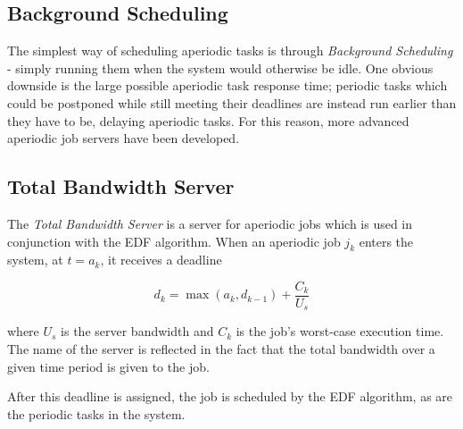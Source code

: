 \subsection{Background Scheduling}
The simplest way of scheduling aperiodic tasks is through \emph{Background Scheduling} - simply running them when the system would otherwise be idle. One obvious downside is the large possible aperiodic task response time; periodic tasks which could be postponed while still meeting their deadlines are instead run earlier than they have to be, delaying aperiodic tasks. For this reason, more advanced aperiodic job servers have been developed.

\subsection{Total Bandwidth Server}
The \emph{Total Bandwidth Server} is a server for aperiodic jobs which is used in conjunction with the EDF algorithm. When an aperiodic job $j_k$ enters the system, at $t = a_k$, it receives a deadline

\begin{equation}
    d_k = \max(a_k, d_{k-1}) + \frac{C_k}{U_s}
\end{equation}

where $U_s$ is the server bandwidth and $C_k$ is the job's worst-case execution time. The name of the server is reflected in the fact that the total bandwidth over a given time period is given to the job.

After this deadline is assigned, the job is scheduled by the EDF algorithm, as are the periodic tasks in the system.

